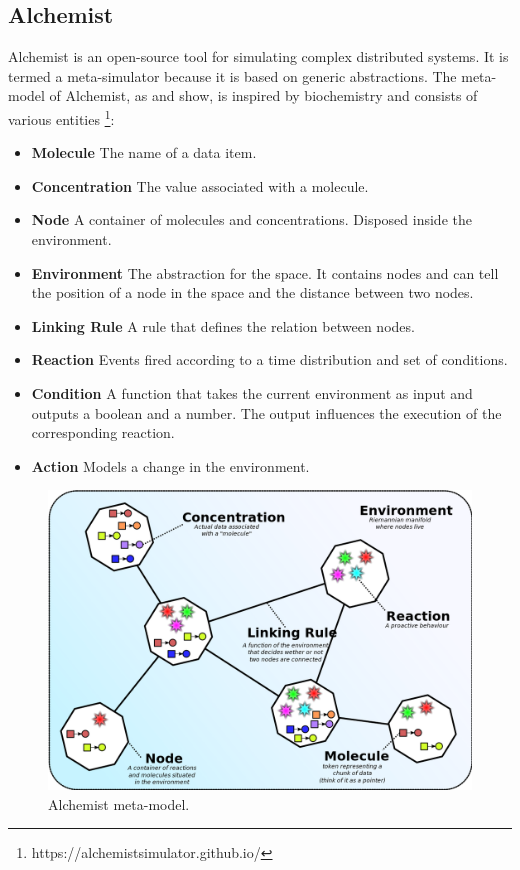 \documentclass[12pt,a4paper,openright,twoside]{book}
\begin{document}
\subsection{Alchemist}

Alchemist \cite{Pianini_2013} is an open-source tool for simulating complex distributed systems. It is termed a meta-simulator because it is based on generic abstractions.
The meta-model of Alchemist, as  and  show, is inspired by biochemistry and consists of various entities \footnote{https://alchemistsimulator.github.io/}:
\begin{itemize}
  \item \textbf{Molecule} The name of a data item.
  \item \textbf{Concentration} The value associated with a molecule.
  \item \textbf{Node} A container of molecules and concentrations. Disposed inside the environment.
  \item \textbf{Environment} The abstraction for the space. It contains nodes and can tell the position of a node in the space and the distance between two nodes.
  \item \textbf{Linking Rule} A rule that defines the relation between nodes.
  \item \textbf{Reaction} Events fired according to a time distribution and set of conditions.
  \item \textbf{Condition} A function that takes the current environment as input and outputs a boolean and a number. The output influences the execution of the corresponding reaction.
  \item \textbf{Action} Models a change in the environment.
\end{itemize}

\begin{figure}[h!]
  \centering
  \includegraphics[width=\textwidth]{figures/alchemist-model.png}
  \caption{Alchemist meta-model.}
  \label{fig:alchemist-meta-model}
\end{figure}
\end{document}
